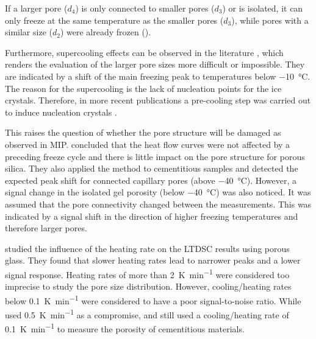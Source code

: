 If a larger pore ($d_4$) is only connected to smaller pores ($d_3$) or is isolated, it can only freeze at the same temperature as the smaller pores ($d_3$), while pores with a similar size ($d_2$) were already frozen ().


Furthermore, supercooling effects can be observed in the literature \cite{setzer.1994,sant.2011}, which renders the evaluation of the larger pore sizes more difficult or impossible.
They are indicated by a shift of the main freezing peak to temperatures below \qty{-10}{\celsius}.
The reason for the supercooling is the lack of nucleation points for the ice crystals.
Therefore, in more recent publications a pre-cooling step was carried out to induce nucleation crystals \cite{nguyen.2021,mueller.2021,joseph.2024}.

This raises the question of whether the pore structure will be damaged as observed in \ac{MIP}.
\Textcite{wu.2015} concluded that the heat flow curves were not affected by a preceding freeze cycle and there is little impact on the pore structure for porous silica.
They also applied the method to cementitious samples and detected the expected peak shift for connected capillary pores (above \qty{-40}{\celsius}).
However, a signal change in the isolated gel porosity (below \qty{-40}{\celsius}) was also noticed.
It was assumed that the pore connectivity changed between the measurements.
This was indicated by a signal shift in the direction of higher freezing temperatures and therefore larger pores.

\Textcite{neffati.2001} studied the influence of the heating rate on the \ac{LTDSC} results using porous glass.
They found that slower heating rates lead to narrower peaks and a lower signal response.
Heating rates of more than \qty{2}{\kelvin\per\minute} were considered too imprecise to study the pore size distribution.
However, cooling/heating rates below \qty{0.1}{\kelvin\per\minute} were considered to have a poor signal-to-noise ratio.
While \textcite{joseph.2024} used \qty{0.5}{\kelvin\per\minute} as a compromise, \textcite{wu.2015} and \textcite{ghantous.2023} still used a cooling/heating rate of \qty{0.1}{\kelvin\per\minute} to measure the porosity of cementitious materials.

